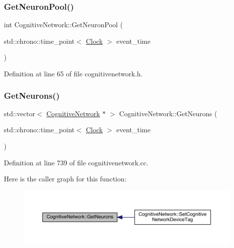 \subsubsection{\texorpdfstring{Get\+Neuron\+Pool()}{GetNeuronPool()}}
{\footnotesize\ttfamily int Cognitive\+Network\+::\+Get\+Neuron\+Pool (\begin{DoxyParamCaption}\item[{std\+::chrono\+::time\+\_\+point$<$ \hyperlink{universe_8h_a0ef8d951d1ca5ab3cfaf7ab4c7a6fd80}{Clock} $>$}]{event\+\_\+time }\end{DoxyParamCaption})\hspace{0.3cm}{\ttfamily [inline]}}



Definition at line 65 of file cognitivenetwork.\+h.

\mbox{\label{class_cognitive_network_a0e9e37e976a7ca5ee625e2d7b36fd7ea}} 
\subsubsection{\texorpdfstring{Get\+Neurons()}{GetNeurons()}}
{\footnotesize\ttfamily std\+::vector$<$ \hyperlink{class_cognitive_network}{Cognitive\+Network} $\ast$ $>$ Cognitive\+Network\+::\+Get\+Neurons (\begin{DoxyParamCaption}\item[{std\+::chrono\+::time\+\_\+point$<$ \hyperlink{universe_8h_a0ef8d951d1ca5ab3cfaf7ab4c7a6fd80}{Clock} $>$}]{event\+\_\+time }\end{DoxyParamCaption})}



Definition at line 739 of file cognitivenetwork.\+cc.

Here is the caller graph for this function\+:
\nopagebreak
\begin{figure}[H]
\begin{center}
\leavevmode
\includegraphics[width=350pt]{class_cognitive_network_a0e9e37e976a7ca5ee625e2d7b36fd7ea_icgraph}
\end{center}
\end{figure}
\mbox{\label{class_cognitive_network_a85890c201376061b1ffbe8fdfc1a8633}} 
